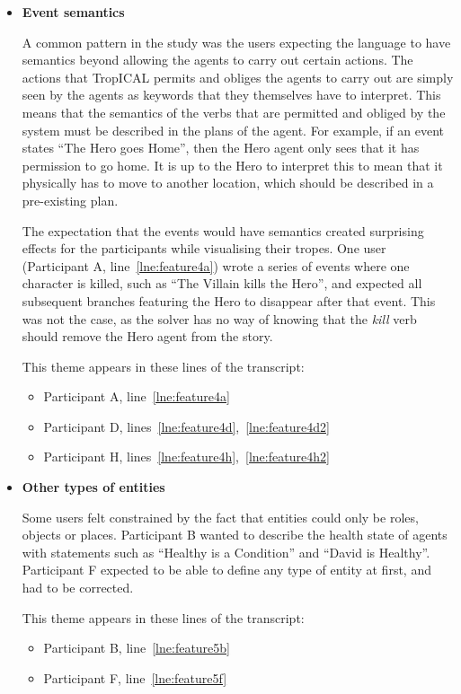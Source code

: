 \documentclass[11pt]{report}
\newcommand{\lref}[1]{\hyperlink{llineno:#1}{\ref*{#1}}}
\begin{document}
\begin{itemize}
\item \textbf{Event semantics}

A common pattern in the study was the users expecting the language to have
semantics beyond allowing the agents to carry out certain actions. The actions
that TropICAL permits and obliges the agents to carry out are simply seen by the
agents as keywords that they themselves have to interpret. This means that the
semantics of the verbs that are permitted and obliged by the system must be
described in the plans of the agent. For example, if an event states ``The Hero
goes Home'', then the Hero agent only sees that it has permission to go home. It
is up to the Hero to interpret this to mean that it physically has to move to
another location, which should be described in a pre-existing plan.

The expectation that the events would have semantics created surprising effects
for the participants while visualising their tropes. One user (Participant A,
line~\lref{lne:feature4a}) wrote a series of events where one character is killed, such as ``The Villain kills the Hero'',
and expected all subsequent branches featuring the Hero to disappear after that
event. This was not the case, as the solver has no way of knowing that the
\emph{kill} verb should remove the Hero agent from the story.

This theme appears in these lines of the transcript:

\begin{itemize}
\item Participant A, line~\lref{lne:feature4a}
\item Participant D, lines~\lref{lne:feature4d},~\lref{lne:feature4d2}
\item Participant H, lines~\lref{lne:feature4h},~\lref{lne:feature4h2}
\end{itemize}

\item \textbf{Other types of entities}

Some users felt constrained by the fact that entities could only be roles,
objects or places. Participant B wanted to describe the health state of agents
with statements such as ``Healthy is a Condition'' and ``David is Healthy''.
Participant F expected to be able to define any type of entity at first, and had
to be corrected.

This theme appears in these lines of the transcript:

\begin{itemize}
\item Participant B, line~\lref{lne:feature5b}
\item Participant F, line~\lref{lne:feature5f}
\end{itemize}


\end{itemize}
\end{document}
